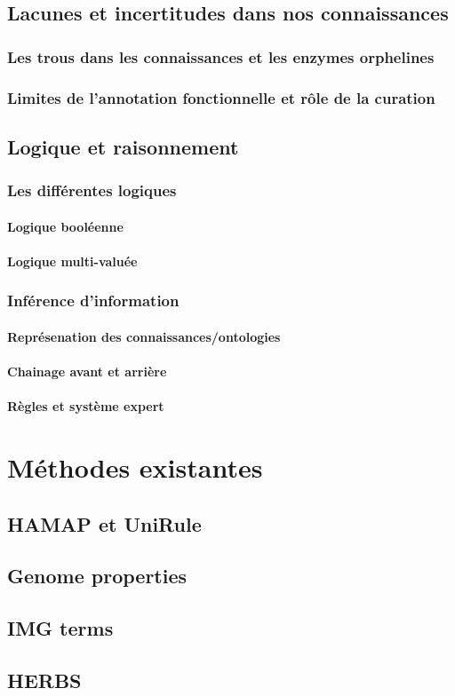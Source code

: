 \begin{refsection}
    \subsection{Lacunes et incertitudes dans nos connaissances}
    \subsubsection{Les trous dans les connaissances et les enzymes orphelines}
    \subsubsection{Limites de l’annotation fonctionnelle et rôle de la curation}
    \subsection{Logique et raisonnement}
    \subsubsection{Les différentes logiques}
    \paragraph{Logique booléenne}
    \paragraph{Logique multi-valuée}
    \subsubsection{Inférence d’information}
    \paragraph{Représenation des connaissances/ontologies}
    \paragraph{Chainage avant et arrière} %
    \paragraph{Règles et système expert}
    
    \section{Méthodes existantes}
    \subsection{HAMAP et UniRule}
    \subsection{Genome properties}
    \subsection{IMG terms}
    \subsection{HERBS}
    
    \subbibliography
\end{refsection}